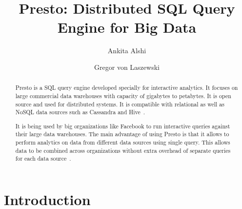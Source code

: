 
\title{Presto: Distributed SQL Query Engine for Big Data}


\author{Ankita Alshi}

\author{Gregor von Laszewski}




\begin{abstract}
Presto is a SQL query engine developed specially for interactive analytics. It
focuses on large commercial data warehouses with capacity of gigabytes to
petabytes. It is open source and used for distributed systems. It is compatible
with relational as well as NoSQL data sources such as Cassandra and
Hive~\cite{hid-sp18-502-Presto}.

It is being used by big organizations like Facebook to run interactive queries
against their large data warehouses. The main advantage of using Presto is that
it allows to perform analytics on data from different data sources using single
query. This allows data to be combined across organizations without extra
overhead of separate queries for each data source~\cite{hid-sp18-502-Presto}.
\end{abstract}



\maketitle


\section{Introduction}

